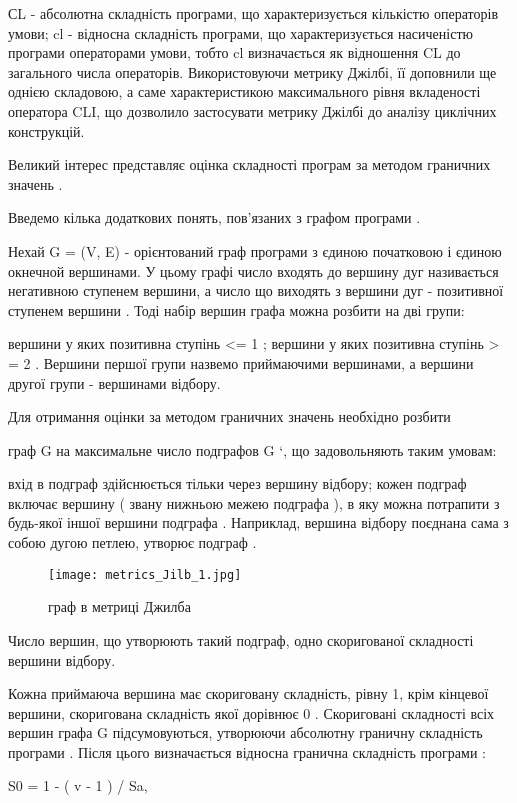 СL - абсолютна складність програми, що характеризується кількістю операторів умови;
cl - відносна складність програми, що характеризується насиченістю програми операторами умови, тобто cl визначається як відношення CL до загального числа операторів.
Використовуючи метрику Джілбі, її доповнили ще однією складовою, а саме характеристикою максимального рівня вкладеності оператора CLI, що дозволило застосувати метрику Джілбі до аналізу циклічних конструкцій.

Великий інтерес представляє оцінка складності програм за методом граничних значень .

Введемо кілька додаткових понять, пов'язаних з графом програми .

Нехай G = (V, E) - орієнтований граф програми з єдиною початковою і єдиною окнечной вершинами. У цьому графі число входять до вершину дуг називається негативною ступенем вершини, а число що виходять з вершини дуг - позитивної ступенем вершини . Тоді набір вершин графа можна розбити на дві групи:

вершини у яких позитивна ступінь \textless{}= 1 ;
вершини у яких позитивна ступінь \textgreater{} = 2 .
Вершини першої групи назвемо приймаючими вершинами, а вершини другої групи - вершинами відбору.

Для отримання оцінки за методом граничних значень необхідно розбити

граф G на максимальне число подграфов G `, що задовольняють таким умовам:

вхід в подграф здійснюється тільки через вершину відбору;
кожен подграф включає вершину ( звану нижньою межею подграфа ), в яку можна потрапити з будь-якої іншої вершини подграфа . Наприклад, вершина відбору поєднана сама з собою дугою петлею, утворює подграф .

\begin{figure}
    \centering
    \texttt{[image: metrics\_Jilb\_1.jpg]}
    \caption{граф в метриці Джилба}
    \label{fig:awesome_image}
\end{figure}

Число вершин, що утворюють такий подграф, одно скоригованої складності вершини відбору.

Кожна приймаюча вершина має скориговану складність, рівну 1, крім кінцевої вершини, скоригована складність якої дорівнює 0 . Скориговані складності всіх вершин графа G підсумовуються, утворюючи абсолютну граничну складність програми . Після цього визначається відносна гранична складність програми :

S0 = 1 - ( v - 1 ) / Sa,

